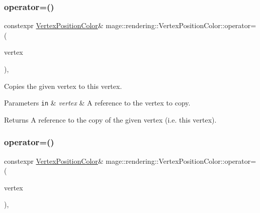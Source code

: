\subsubsection{\texorpdfstring{operator=()}{operator=()}\hspace{0.1cm}{\footnotesize\ttfamily [1/2]}}
{\footnotesize\ttfamily constexpr \hyperlink{structmage_1_1rendering_1_1_vertex_position_color}{Vertex\+Position\+Color}\& mage\+::rendering\+::\+Vertex\+Position\+Color\+::operator= (\begin{DoxyParamCaption}\item[{const \hyperlink{structmage_1_1rendering_1_1_vertex_position_color}{Vertex\+Position\+Color} \&}]{vertex }\end{DoxyParamCaption})\hspace{0.3cm}{\ttfamily [default]}, {\ttfamily [noexcept]}}

Copies the given vertex to this vertex.


\begin{DoxyParams}[1]{Parameters}
\mbox{\tt in}  & {\em vertex} & A reference to the vertex to copy. \\
\hline
\end{DoxyParams}
\begin{DoxyReturn}{Returns}
A reference to the copy of the given vertex (i.\+e. this vertex). 
\end{DoxyReturn}
\hypertarget{structmage_1_1rendering_1_1_vertex_position_color_afd66f27ff1c0a372f729960260b4decd}{}\label{structmage_1_1rendering_1_1_vertex_position_color_afd66f27ff1c0a372f729960260b4decd} 
\subsubsection{\texorpdfstring{operator=()}{operator=()}\hspace{0.1cm}{\footnotesize\ttfamily [2/2]}}
{\footnotesize\ttfamily constexpr \hyperlink{structmage_1_1rendering_1_1_vertex_position_color}{Vertex\+Position\+Color}\& mage\+::rendering\+::\+Vertex\+Position\+Color\+::operator= (\begin{DoxyParamCaption}\item[{\hyperlink{structmage_1_1rendering_1_1_vertex_position_color}{Vertex\+Position\+Color} \&\&}]{vertex }\end{DoxyParamCaption})\hspace{0.3cm}{\ttfamily [default]}, {\ttfamily [noexcept]}}

